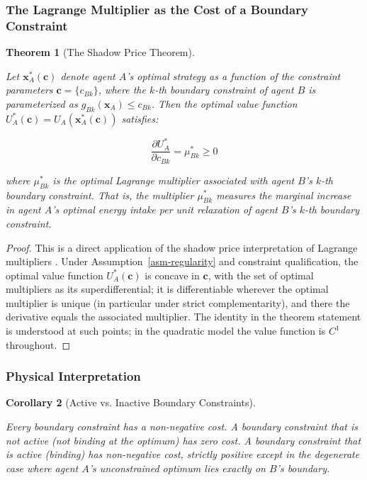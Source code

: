 \documentclass[11pt]{article}
\theoremstyle{plain}
\newtheorem{theorem}{Theorem}
\newtheorem{corollary}[theorem]{Corollary}
\theoremstyle{definition}
\theoremstyle{remark}
\let\origsubsubsection\subsubsection
\renewcommand{\subsubsection}{\needspace{4\baselineskip}\origsubsubsection}
\begin{document}
\subsubsection{The Lagrange Multiplier as the Cost of a Boundary
Constraint}\label{the-lagrange-multiplier-as-the-cost-of-a-boundary-constraint}

\begin{theorem}[The Shadow Price Theorem]
\label{thm-shadow-price}

Let $\mathbf{x}_A^*(\boldsymbol{c})$ denote agent $A$'s optimal strategy as a function of the constraint parameters $\boldsymbol{c} = \{c_{Bk}\}$, where the $k$-th boundary constraint of agent $B$ is parameterized as $g_{Bk}(\mathbf{x}_A) \leq c_{Bk}$. Then the optimal value function $U_A^*(\boldsymbol{c}) = U_A(\mathbf{x}_A^*(\boldsymbol{c}))$ satisfies:

$$\frac{\partial U_A^*}{\partial c_{Bk}} = \mu_{Bk}^* \geq 0$$

where $\mu_{Bk}^*$ is the optimal Lagrange multiplier associated with agent $B$'s $k$-th boundary constraint. That is, the multiplier $\mu_{Bk}^*$ measures the marginal increase in agent $A$'s optimal energy intake per unit relaxation of agent $B$'s $k$-th boundary constraint.
\end{theorem}

\begin{proof}
This is a direct application of the shadow price interpretation of Lagrange multipliers \citep[see][§5.6.3]{Boyd2004}. Under Assumption~\ref{asm-regularity} and constraint qualification, the optimal value function $U_A^*(\boldsymbol{c})$ is concave in $\boldsymbol{c}$, with the set of optimal multipliers as its superdifferential; it is differentiable wherever the optimal multiplier is unique (in particular under strict complementarity), and there the derivative equals the associated multiplier. The identity in the theorem statement is understood at such points; in the quadratic model the value function is $C^1$ throughout.
\end{proof}

\subsubsection{Physical Interpretation}\label{physical-interpretation}

\begin{corollary}[Active vs. Inactive Boundary Constraints]
\label{cor-active-inactive-constraints}

Every boundary constraint has a non-negative cost. A boundary constraint that is not active (not binding at the optimum) has zero cost. A boundary constraint that is active (binding) has non-negative cost, strictly positive except in the degenerate case where agent $A$'s unconstrained optimum lies exactly on $B$'s boundary.
\end{corollary}
\end{document}
